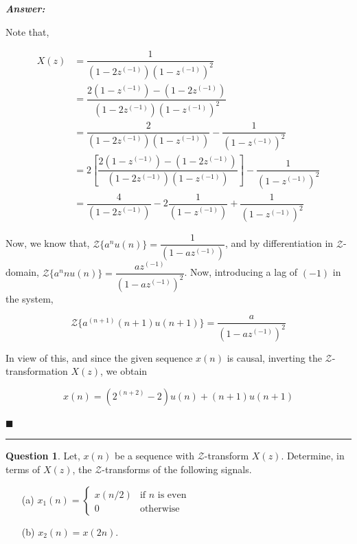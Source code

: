 \documentclass[12pt]{article}
\theoremstyle{definition}
\newtheorem{question}{Question}
\newenvironment{answer}{
    \textbf{\textit{Answer:}} \qquad
}{\hfill $\blacksquare$ \\ 

\begin{center}
    \rule{0.8\linewidth}{1.5px} 
    \vspace*{1cm}   
\end{center}
}
\newcommand{\zcal}{\mathcal{Z}}
\newcommand{\inv}[1][1]{^{(- #1)}}
\begin{document}
\begin{answer}
    Note that,

    \begin{align*}
        X(z)
        & = \dfrac{1}{(1 - 2z^{(-1)})(1 - z^{(-1)})^2}\\
        & = \dfrac{2(1 - z\inv) - (1 - 2z\inv)}{(1 - 2z\inv)(1 - z\inv)^2}\\
        & = \dfrac{2}{(1 - 2z\inv)(1 - z\inv)} - \dfrac{1}{(1 - z\inv)^2}\\
        & = 2 \left[ \dfrac{2(1 - z\inv) - (1 - 2z\inv)}{(1 - 2z\inv)(1 - z\inv)} \right] - \dfrac{1}{(1 - z\inv)^2}\\
        & = \dfrac{4}{(1 - 2z\inv)} - 2 \dfrac{1}{(1 - z\inv)} + \dfrac{1}{(1 - z\inv)^2}
    \end{align*}

    Now, we know that, $\zcal\{ a^n u(n) \} = \dfrac{1}{(1 - az\inv)}$, and by differentiation in $\zcal$-domain, $\zcal\{ a^n n u(n) \} = \dfrac{az\inv}{(1 - a z\inv)^2}$. Now, introducing a lag of $(-1)$ in the system, 

    $$
    \zcal\{ a^{(n+1)}(n+1)u(n+1) \} = \dfrac{a}{(1 - az\inv)^2}
    $$

    In view of this, and since the given sequence $x(n)$ is causal, inverting the $\zcal$-transformation $X(z)$, we obtain

    $$
    x(n) = (2^{(n+2)} - 2) u(n) + (n+1) u(n+1)
    $$

\end{answer}


\begin{question}
    Let, $x(n)$ be a sequence with $\zcal$-transform $X(z)$. Determine, in terms of $X(z)$, the $\zcal$-transforms of the following signals.
    \begin{enumerate}
        \item[(a)] $x_1(n) = \begin{cases}
            x(n/2) & \text{if } n \text{ is even}\\
            0 & \text{otherwise}
        \end{cases}$
        \item[(b)] $x_2(n) = x(2n)$.
    \end{enumerate}
\end{question}
\end{document}
